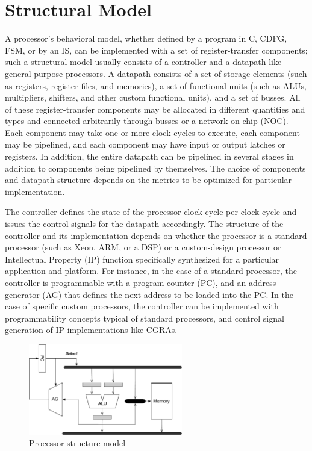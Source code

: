 \section{Structural Model}

A processor’s behavioral model, whether defined by a program in C, CDFG, FSM, or by an IS, can be implemented with a set of register-transfer components; such a structural model usually consists of a controller and a datapath like general purpose processors.
A datapath consists of a set of storage elements (such as registers, register files, and memories), a set of functional units (such as ALUs, multipliers, shifters, and other custom functional units), and a set of busses.
All of these register-transfer components may be allocated in different quantities and types and connected arbitrarily through busses or a network-on-chip (NOC).
Each component may take one or more clock cycles to execute, each component may be pipelined, and each component may have input or output latches or registers.
In addition, the entire datapath can be pipelined in several stages in addition to components being pipelined by themselves.
The choice of components and datapath structure depends on the metrics to be optimized for particular implementation.

The controller defines the state of the processor clock cycle per clock cycle and issues the control signals for the datapath accordingly.
The structure of the controller and its implementation depends on whether the processor is a standard processor (such as Xeon, ARM, or a DSP) or a custom-design processor or Intellectual Property (IP) function specifically synthesized for a particular application and platform.
For instance, in the case of a standard processor, the controller is programmable with a program counter (PC), and an address generator (AG) that defines the next address to be loaded into the PC.
In the case of specific custom processors, the controller can be implemented with programmability concepts typical of standard processors, and control signal generation of IP implementations like CGRAs.

\begin{figure}[h]
    \centering
    \includegraphics[width=0.6\textwidth]{figures/Introduction/Processor_Structure.pdf}
    \caption{Processor structure model}
    \label{fig:proc_structure}
\end{figure}



